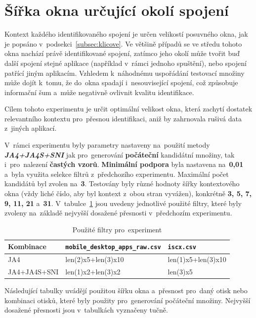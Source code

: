 \section{Šířka okna určující okolí spojení}
\label{sec:ex-window}
Kontext každého identifikovaného spojení je určen velikostí posuvného okna, jak je popsáno v~podsekci~\ref{subsec:klicove}. Ve většině případů se ve středu tohoto okna nachází právě identifikované spojení, zatímco jeho okolí může tvořit buď další spojení stejné aplikace (například v~rámci jednoho spuštění), nebo spojení patřící jiným aplikacím. Vzhledem k~náhodnému uspořádání testovací množiny může dojít k~tomu, že do~okna spadají i~nesouvisející spojení, což způsobuje informační šum a~může negativně ovlivnit kvalitu identifikace.

Cílem tohoto experimentu je určit optimální velikost okna, která zachytí dostatek relevantního kontextu pro~přesnou identifikaci, aniž by zahrnovala rušivá data z~jiných aplikací. 

V~rámci experimentu byly parametry nastaveny na~použití metody \textbf{\textit{JA4+JA4S+SNI}} jak pro~generování \textbf{počáteční} kandidátní množiny, tak i~pro~nalezení \textbf{častých vzorů}. \textbf{Minimální podpora} byla nastavena na~\textbf{0{,}01} a~byla využita selekce filtrů z~předchozího experimentu. Maximální počet kandidátů byl zvolen na~\textbf{3}. Testovány byly různé hodnoty šířky kontextového okna (vždy liché číslo, aby byl kontext z~obou stran vyvážen), konkrétně \textbf{3, 5, 7, 9, 11, 21} a~\textbf{31}.
V~tabulce~\ref{tab:used_filters-ex4} jsou uvedeny jednotlivé použité filtry, které byly zvoleny na~základě nejvyšší dosažené přesnosti v~předchozím experimentu.

\begin{table}[H]
	\centering
	\begin{tabular}{lll}
		\toprule
		Kombinace    & \texttt{mobile\_desktop\_apps\_raw.csv} & \texttt{iscx.csv}  \\
		\midrule
		JA4          & len(2)x5+len(3)x10                      & len(1)x5+len(3)x10 \\
		JA4+JA4S+SNI & len(1)x2+len(3)x2                       & len(3)x5           \\
		\bottomrule
	\end{tabular}
	\caption{Použité filtry pro~experiment}
	\label{tab:used_filters-ex4}
\end{table}
Následující tabulky uvádějí použitou šířku okna a~přesnost pro~daný otisk nebo kombinaci otisků, které byly použity pro~generování počáteční množiny. Nejvyšší dosažené přesnosti jsou v~tabulkách vyznačeny tučně.

